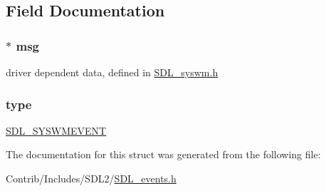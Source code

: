 \subsection{Field Documentation}
\subsubsection[{\texorpdfstring{msg}{msg}}]{$\ast$ msg}\hypertarget{struct_s_d_l___sys_w_m_event_a7b74458e040fff2d0b02a00df56049b0}{}\label{struct_s_d_l___sys_w_m_event_a7b74458e040fff2d0b02a00df56049b0}
driver dependent data, defined in \hyperlink{_s_d_l__syswm_8h}{S\+D\+L\+\_\+syswm.\+h} 
\subsubsection[{\texorpdfstring{type}{type}}]{ type}\hypertarget{struct_s_d_l___sys_w_m_event_aa40a9b05c3154032b9f2d7220e9f08dc}{}\label{struct_s_d_l___sys_w_m_event_aa40a9b05c3154032b9f2d7220e9f08dc}
\hyperlink{_s_d_l__events_8h_a3b589e89be6b35c02e0dd34a55f3fccaa73749d735a18ce6ef17a09ee70d5dbe7}{S\+D\+L\+\_\+\+S\+Y\+S\+W\+M\+E\+V\+E\+NT} 

The documentation for this struct was generated from the following file\+:\begin{DoxyCompactItemize}
\item 
Contrib/\+Includes/\+S\+D\+L2/\hyperlink{_s_d_l__events_8h}{S\+D\+L\+\_\+events.\+h}\end{DoxyCompactItemize}
